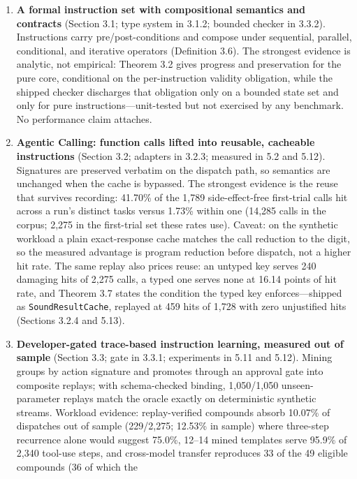 \documentclass[
  sigconf,
  anonymous]{acmart}
\newcounter{none} %
\begin{document}
\begin{enumerate}
\def\labelenumi{\arabic{enumi}.}
\item
  \textbf{A formal instruction set with compositional semantics and
  contracts} (Section 3.1; type system in 3.1.2; bounded checker in
  3.3.2). Instructions carry pre/post-conditions and compose under
  sequential, parallel, conditional, and iterative operators (Definition
  3.6). The strongest evidence is analytic, not empirical: Theorem 3.2
  gives progress and preservation for the pure core, conditional on the
  per-instruction validity obligation, while the shipped checker
  discharges that obligation only on a bounded state set and only for
  pure instructions---unit-tested but not exercised by any benchmark. No
  performance claim attaches.
\item
  \textbf{Agentic Calling: function calls lifted into reusable,
  cacheable instructions} (Section 3.2; adapters in 3.2.3; measured in
  5.2 and 5.12). Signatures are preserved verbatim on the dispatch path,
  so semantics are unchanged when the cache is bypassed. The strongest
  evidence is the reuse that survives recording: 41.70\% of the 1,789
  side-effect-free first-trial calls hit across a run's distinct tasks
  versus 1.73\% within one (14,285 calls in the corpus; 2,275 in the
  first-trial set these rates use). Caveat: on the synthetic workload a
  plain exact-response cache matches the call reduction to the digit, so
  the measured advantage is program reduction before dispatch, not a
  higher hit rate. The same replay also prices reuse: an untyped key
  serves 240 damaging hits of 2,275 calls, a typed one serves none at
  16.14 points of hit rate, and Theorem 3.7 states the condition the
  typed key enforces---shipped as \texttt{SoundResultCache}, replayed at
  459 hits of 1,728 with zero unjustified hits (Sections 3.2.4 and
  5.13).
\item
  \textbf{Developer-gated trace-based instruction learning, measured out
  of sample} (Section 3.3; gate in 3.3.1; experiments in 5.11 and 5.12).
  Mining groups by action signature and promotes through an approval
  gate into composite replays; with schema-checked binding, 1,050/1,050
  unseen-parameter replays match the oracle exactly on deterministic
  synthetic streams. Workload evidence: replay-verified compounds absorb
  10.07\% of dispatches out of sample (229/2,275; 12.53\% in sample)
  where three-step recurrence alone would suggest 75.0\%, 12--14 mined
  templates serve 95.9\% of 2,340 tool-use steps, and cross-model
  transfer reproduces 33 of the 49 eligible compounds (36 of which the

\end{enumerate}
\end{document}
